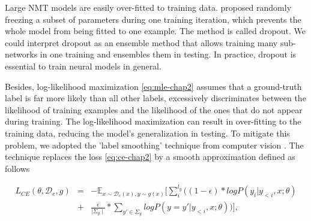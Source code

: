 Large NMT models are easily over-fitted to training data. \citet{Srivastava14Dropout} proposed randomly freezing a subset of parameters during one training iteration, which prevents the whole model from being fitted to one example. The method is called dropout. We could interpret dropout as an ensemble method that allows training many sub-networks in one training and ensembles them in testing. In practice, dropout is essential to train neural models in general. 

Besides, log-likelihood maximization \eqref{eq:mle-chap2} assumes that a ground-truth label is far more likely than all other labels, excessively discriminates between the likelihood of training examples and the likelihood of the ones that do not appear during training. The log-likelihood maximization can result in over-fitting to the training data, reducing the model's generalization in testing. To mitigate this problem, we adopted the 'label smoothing' technique from computer vision \citet{Szegedy16rethinking}. The technique replaces the loss \eqref{eq:ce-chap2} by a smooth approximation defined as follows

\begin{equation}
\begin{array}{rcl}
L_{CE}(\theta, \mathcal{D}_e, g) &=& -\displaystyle{ \mathbb{E}_{x \sim \mathcal{D}_e(x), y \sim g(x)}} \bigg[ \displaystyle{\mathop{\sum}_{i}^{l_y}} \big( (1-\epsilon) * log P(y_i|y_{<i},x;\theta) \\
	&+& \frac{\epsilon}{\mid \Sigma_y \mid} * \displaystyle{\mathop{\sum}_{y' \in \Sigma_y}} log P(y = y'|y_{<i},x;\theta)\big) \bigg], \\
\end{array}
\end{equation}

